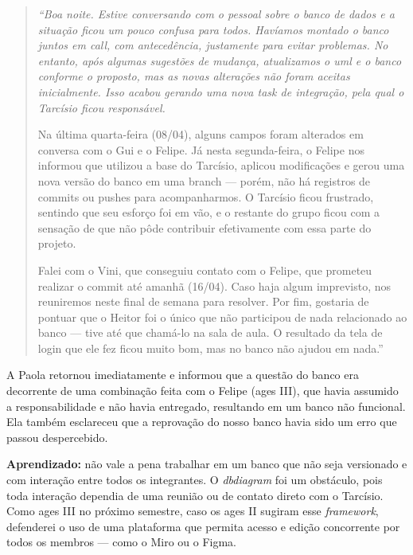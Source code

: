 \begin{quotation}
\itshape
``Boa noite. Estive conversando com o pessoal sobre o banco de dados e a
situação ficou um pouco confusa para todos. Havíamos montado o banco juntos em
call, com antecedência, justamente para evitar problemas. No entanto, após algumas
sugestões de mudança, atualizamos o \ac{uml} e o banco conforme o proposto, mas as
novas alterações não foram aceitas inicialmente. Isso acabou gerando uma nova task de
integração, pela qual o Tarcísio ficou responsável.

Na última quarta-feira (08/04), alguns campos foram alterados em conversa com o Gui
e o Felipe. Já nesta segunda-feira, o Felipe nos informou que utilizou a base do
Tarcísio, aplicou modificações e gerou uma nova versão do banco em uma branch ---
porém, não há registros de commits ou pushes para acompanharmos. O Tarcísio ficou
frustrado, sentindo que seu esforço foi em vão, e o restante do grupo ficou com a
sensação de que não pôde contribuir efetivamente com essa parte do projeto.

Falei com o Vini, que conseguiu contato com o Felipe, que prometeu realizar o commit
até amanhã (16/04). Caso haja algum imprevisto, nos reuniremos neste final de semana
para resolver. Por fim, gostaria de pontuar que o Heitor foi o único que não participou
de nada relacionado ao banco --- tive até que chamá-lo na sala de aula. O resultado da
tela de login que ele fez ficou muito bom, mas no banco não ajudou em nada.''
\end{quotation}

A Paola retornou imediatamente e informou que a questão do banco era decorrente de
uma combinação feita com o Felipe (\ac{ages} III), que havia assumido a responsabilidade
e não havia entregado, resultando em um banco não funcional. Ela também esclareceu
que a reprovação do nosso banco havia sido um erro que passou despercebido.

\textbf{Aprendizado:} não vale a pena trabalhar em um banco que não seja versionado
e com interação entre todos os integrantes. O \textit{dbdiagram} foi um obstáculo,
pois toda interação dependia de uma reunião ou de contato direto com o Tarcísio.
Como \ac{ages} III no próximo semestre, caso os \ac{ages} II sugiram esse \textit{framework},
defenderei o uso de uma plataforma que permita acesso e edição concorrente por todos
os membros --- como o Miro ou o Figma.
